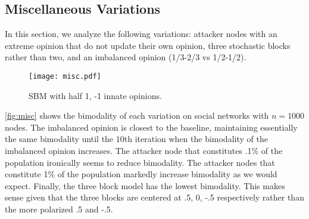 \subsection{Miscellaneous Variations}

In this section, we analyze the following variations:
attacker nodes with an extreme opinion that do not update
their own opinion, three stochastic blocks rather than two,
and an imbalanced opinion (1/3-2/3 vs 1/2-1/2).

\begin{figure}[h]
    \centering
    \texttt{[image: misc.pdf]}
    \caption{SBM with half 1, -1 innate opinions.}
    \label{fig:misc}
\end{figure}

\autoref{fig:misc} shows the bimodality of each variation
on social networks with $n=1000$ nodes.
The imbalanced opinion is closest to the baseline,
maintaining essentially the same bimodality until the $10$th
iteration when the bimodality of the imbalanced opinion increases.
The attacker node that constitutes .1\% of the population
ironically seems to reduce bimodality.
The attacker nodes that constitute 1\% of the population
markedly increase bimodality as we would expect.
Finally, the three block model has the lowest bimodality.
This makes sense given that the three blocks are centered
at .5, 0, -.5 respectively rather than the more polarized
.5 and -.5.

